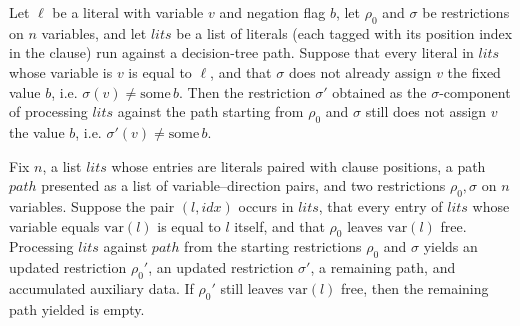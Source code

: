 \begin{lemma}
\label{SwitchingLemma.processClauseLits_sigma_ne_neg}
\leanok
{}
Let $\ell$ be a literal with variable $v$ and negation flag $b$, let $\rho_0$ and
$\sigma$ be restrictions on $n$ variables, and let $\mathit{lits}$ be a list of literals
(each tagged with its position index in the clause) run against a decision-tree path.
Suppose that every literal in $\mathit{lits}$ whose variable is $v$ is equal to $\ell$,
and that $\sigma$ does not already assign $v$ the fixed value $b$, i.e. $\sigma(v) \neq
\mathrm{some}\,b$. Then the restriction $\sigma'$ obtained as the $\sigma$-component of
processing $\mathit{lits}$ against the path starting from $\rho_0$ and $\sigma$ still
does not assign $v$ the value $b$, i.e. $\sigma'(v) \neq \mathrm{some}\,b$.
\end{lemma}

\begin{lemma}
\label{SwitchingLemma.processClauseLits_path_nil_of_rho_none_and_mem}
\leanok
{}
Fix $n$, a list $\mathit{lits}$ whose entries are literals paired with clause positions,
a path $\mathit{path}$ presented as a list of variable–direction pairs, and two
restrictions $\rho_0,\sigma$ on $n$ variables. Suppose the pair $(l,\mathit{idx})$
occurs in $\mathit{lits}$, that every entry of $\mathit{lits}$ whose variable equals
$\mathrm{var}(l)$ is equal to $l$ itself, and that $\rho_0$ leaves $\mathrm{var}(l)$
free. Processing $\mathit{lits}$ against $\mathit{path}$ from the starting restrictions
$\rho_0$ and $\sigma$ yields an updated restriction $\rho_0'$, an updated restriction
$\sigma'$, a remaining path, and accumulated auxiliary data. If $\rho_0'$ still leaves
$\mathrm{var}(l)$ free, then the remaining path yielded is empty.
\end{lemma}

